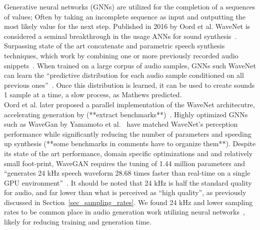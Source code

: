 \documentclass[\main/thesis.tex]{subfiles}
\begin{document}
Generative neural networks (GNNs) are utilized for the completion of a sequences of values; Often by taking an incomplete sequence as input and outputting the most likely value for the next step. Published in 2016 by Oord et al. WaveNet is considered a seminal breakthrough in the usage ANNs for sound synthesis~\cite{oord2016wavenet}. Surpassing state of the art concatenate and parametric speech synthesis techniques, which work by combining one or more previously recorded audio snippets~\cite{schwarz2007corpus}. When trained on a large corpus of audio samples, GNNs such WaveNet can learn the \enquote{predictive distribution for each
audio sample conditioned on all previous ones}~\cite{oord2016wavenet}. Once this distribution is learned, it can be used to create sounds 1 sample at a time, a slow process, as Mathews predicted. \\
Oord et al. later proposed a parallel implementation of the WaveNet architecutre, accelerating generation by (**extract benchmarks**)~\cite{oord2017parallel}. Highly optimized GNNs such as WaveGan by Yamamoto et al.~\cite{yamamoto2020parallel} have matched WaveNet's perception performance while significantly reducing the number of parameters and speeding up synthesis (**some benchmarks in comments have to organize them**). Despite its state of the art performance, domain specific optimizations and and relatively small foot-print, WaveGAN requires the tuning of 1.44 million parameters and \enquote{generates 24 kHz speech waveform 28.68 times faster than real-time on a single GPU environment}~\cite{yamamoto2020parallel}. It should be noted that 24 kHz is half the standard quality for audio, and far lower than what is perceived as \enquote{high quality}, as previously discussed in Section~\ref{sec_sampling_rates}. We found 24 kHz and lower sampling rates to be common place in audio generation work utilizing neural networks~\cite{oord2017parallel,yamamoto2019parallel,aouameur2019neural,ramires2020neural}, likely for reducing training and generation time. 


\end{document}
